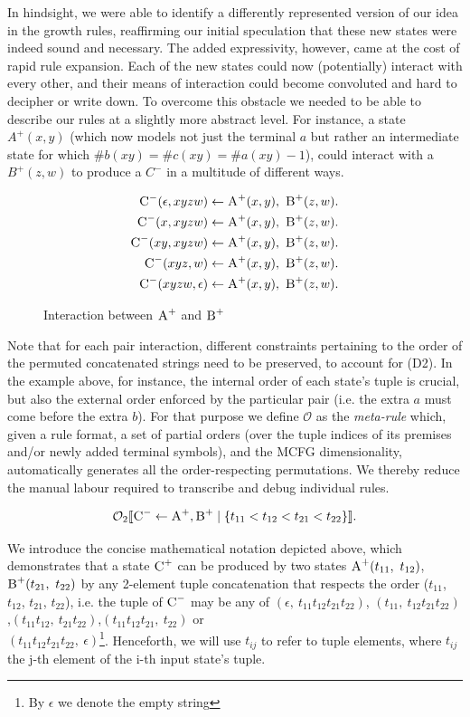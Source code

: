 \documentclass[nonatbib,numbers,10pt]{sigplanconf}
\newcommand\s{\textsc}
\newcommand{\Order}[5]{
	\[
	\mathcal{#1}_{#5}\llbracket #2 \leftarrow #3 \mid \{ #4 \} \rrbracket.
	\]
}
\newcommand{\Ord}[4]{\Order{O}{#1}{#2}{#3}{#4}}
\begin{document}
In hindsight, we were able to identify a differently represented version of our idea in the growth rules, reaffirming our initial speculation that these new states were indeed sound and necessary. The added expressivity, however, came at the cost of rapid rule expansion. Each of the new states could now (potentially) interact with every other, and their means of interaction could become convoluted and hard to decipher or write down. To overcome this obstacle we needed to be able to describe our rules at a slightly more abstract level. For instance, a state $A^{+}(x,y)$ (which now models not just the terminal $a$ but rather an intermediate state for which $ \# b(xy) = \# c(xy) = \# a(xy)-1$), could interact with a $B^{+}(z,w)$ to produce a $C^{-}$ in a multitude of different ways.
\begin{figure}[h!]
\begin{align*}
\setcounter{equation}{0}
\s{C}^-(\epsilon, xyzw) \leftarrow \s{A}^+(x,y),\ \s{B}^+(z,w)&. \\
\s{C}^-(x, xyzw) \leftarrow \s{A}^+(x,y),\ \s{B}^+(z,w)&. \\
\s{C}^-(xy, xyzw) \leftarrow \s{A}^+(x,y),\ \s{B}^+(z,w)&. \\
\s{C}^-(xyz, w) \leftarrow \s{A}^+(x,y),\ \s{B}^+(z,w)&. \\
\s{C}^-(xyzw, \epsilon) \leftarrow \s{A}^+(x,y),\ \s{B}^+(z,w)&.
\end{align*}
\caption{Interaction between $\s{A}^+$ and $\s{B}^+$}
\label{fig:interaction}
\end{figure}

Note that for each pair interaction, different constraints pertaining to the order of the permuted concatenated strings need to be preserved, to account for (D2). In the example above, for instance, the internal order of each state's tuple is crucial, but also the external order enforced by the particular pair (i.e. the extra $a$ must come before the extra $b$). For that purpose we define $\mathcal{O}$ as the \textit{meta-rule} which, given a rule format, a set of partial orders (over the tuple indices of its premises and/or newly added terminal symbols), and the MCFG dimensionality, automatically generates all the order-respecting permutations. We thereby reduce the manual labour required to transcribe and debug individual rules.
\Ord{\s{C}^-}{\s{A}^+, \s{B}^+}{t_{11} < t_{12} < t_{21} < t_{22}}{2}
We introduce the concise mathematical notation depicted above, which demonstrates that a state $\textsc{C}^{+}$ can be produced by two states $\textsc{A}^{+}(t_{11},\ t_{12})$, $\textsc{B}^{+}(t_{21},\ t_{22})$ by any 2-element tuple concatenation that respects the order ($t_{11}$, $t_{12}$, $t_{21}$, $t_{22}$), i.e. the tuple of $\textsc{C}^{-}$ may be any of $(\epsilon,\ t_{11}t_{12}t_{21}t_{22})$, $(t_{11},\ t_{12}t_{21}t_{22})$,\quad $(t_{11}t_{12},\ t_{21}t_{22})$,\quad $(t_{11}t_{12}t_{21},\ t_{22})$ \quad or \\ $(t_{11}t_{12}t_{21}t_{22},\ \epsilon)$\footnote{By $\epsilon$ we denote the empty string}. Henceforth, we will use $t_{ij}$ to refer to tuple elements, where $t_{ij}$ the j-th element of the i-th input state's tuple. 
\end{document}
